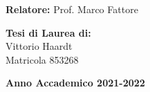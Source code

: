 \begin{titlepage}
        \begin{flushleft}
        

        \noindent
        {\large \textbf{Relatore:} Prof. Marco Fattore } \\

        \end{flushleft}
        
        \vspace{10mm}

        \begin{flushright}
            {\large \textbf{Tesi di Laurea di:}} \\
            \large{Vittorio Haardt} \\
            \large{Matricola 853268} 
        \end{flushright}
        
        \vspace{10mm}
        \begin{center}
            {\large{\bf Anno Accademico 2021-2022}}
        \end{center}

        \restoregeometry
        
    \end{titlepage}
